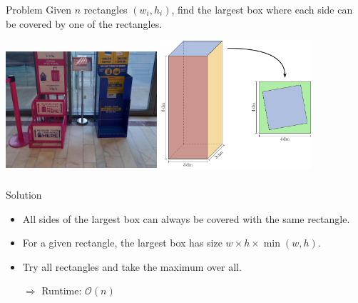 \begin{frame}
    \frametitle{\problemtitle}
    \begin{block}{Problem}
    	Given $n$ rectangles $(w_i, h_i)$, find the largest box where each side can be covered by one of the rectangles.
    \end{block}
	\bigskip
	\centering%
	\includegraphics[width=0.42\textwidth]{luggage}%
	\hfill%
	\includegraphics[width=0.42\textwidth]{sample2}%
\end{frame}

\begin{frame}[c]
	\frametitle{\problemtitle}
	\begin{block}{Solution}
		\begin{itemize}
			\item All sides of the largest box can always be covered with the same rectangle.
			\item For a given rectangle, the largest box has size $w\times h\times\min(w,h)$.
			\item Try all rectangles and take the maximum over all.
			\item[$\Rightarrow$] Runtime: $\mathcal{O}(n)$
		\end{itemize}
	\end{block}
\end{frame}